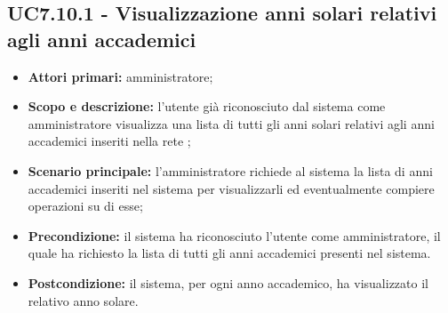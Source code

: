 \documentclass[AnalisiDeiRequisiti.tex]{subfiles}
\begin{document}
\subsection{UC7.10.1 - Visualizzazione anni solari relativi agli anni accademici}
\begin{itemize}
	\item \textbf{Attori primari:} amministratore;
	\item \textbf{Scopo e descrizione:} l'utente già riconosciuto dal sistema come amministratore visualizza una lista di tutti gli anni solari relativi agli anni accademici inseriti nella rete ;
	\item \textbf{Scenario principale:} l'amministratore richiede al sistema la lista di anni accademici inseriti nel sistema per visualizzarli ed eventualmente compiere operazioni su di esse;
	\item \textbf{Precondizione:} il sistema ha riconosciuto l'utente come amministratore, il quale ha richiesto la lista di tutti gli anni accademici presenti nel sistema.
	\item \textbf{Postcondizione:} il sistema, per ogni anno accademico, ha visualizzato il relativo anno solare.
\end{itemize}
\end{document}
